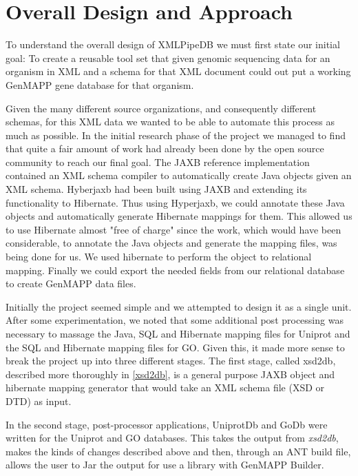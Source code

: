 \section{Overall Design and Approach}
To understand the overall design of XMLPipeDB we must first state our initial 
goal:  To create a reusable tool set that given genomic sequencing data for 
an organism in XML and a schema for that XML document could out put a working 
GenMAPP gene database for that organism.  

Given the many different source organizations, and consequently different schemas,  for this XML data we wanted to be able to automate this process as much as possible.  In the initial research phase of the project we managed to find that quite a fair amount of work had already been done by the open source community to reach our final goal.  The JAXB reference implementation contained an XML schema compiler to automatically create Java objects given an XML schema. Hyberjaxb had been built using JAXB and extending its functionality to Hibernate. Thus using Hyperjaxb, we could annotate these Java objects and automatically generate Hibernate mappings for them. This allowed us to use Hibernate almost "free of charge" since the work, which would have been considerable, to annotate the Java objects and generate the mapping files, was being done for us. We used hibernate to perform the object to relational mapping. Finally we could export the needed fields from our relational database to create GenMAPP data files. 

Initially the project seemed simple and we attempted to design it as a single unit. After some experimentation, we noted that some additional post processing was necessary to massage the Java, SQL and Hibernate mapping files for Uniprot and the SQL and Hibernate mapping files for GO. Given this, it made more sense to break the project up into three different stages.  The first stage, called xsd2db, described more thoroughly in \ref{xsd2db}, is a general purpose JAXB object and hibernate mapping generator that would take an XML schema file (XSD or DTD) as input.   


In the second stage, post-processor applications, UniprotDb and GoDb were written for the Uniprot and GO databases. This takes the output from \emph{xsd2db}, makes the kinds of changes described above and then, through an ANT build file, allows the user to Jar the output for use a library with GenMAPP Builder.

